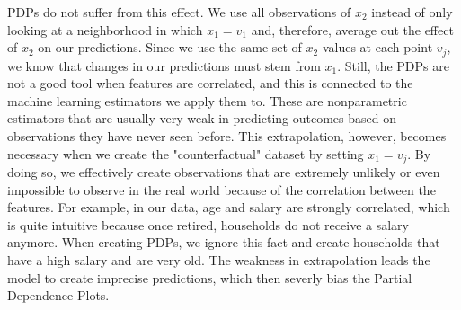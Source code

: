 PDPs do not suffer from this effect. We use all observations of $x_2$ instead of only looking at a neighborhood in which $x_1=v_1$ and, therefore, average out the effect of $x_2$ on our predictions. Since we use the same set of $x_2$ values at each point $v_j$, we know that changes in our predictions must stem from $x_1.$ Still, the PDPs are not a good tool when features are correlated, and this is connected to the machine learning estimators we apply them to. These are nonparametric estimators that are usually very weak in predicting outcomes based on observations they have never seen before. This extrapolation, however, becomes necessary when we create the "counterfactual" dataset by setting $x_1=v_j$. By doing so, we effectively create observations that are extremely unlikely or even impossible to observe in the real world because of the correlation between the features. For example, in our data, age and salary are strongly correlated, which is quite intuitive because once retired, households do not receive a salary anymore. When creating PDPs, we ignore this fact and create households that have a high salary and are very old. The weakness in extrapolation leads the model to create imprecise predictions, which then severly bias the Partial Dependence Plots. \citep{apleyzhu_2020}  \\


